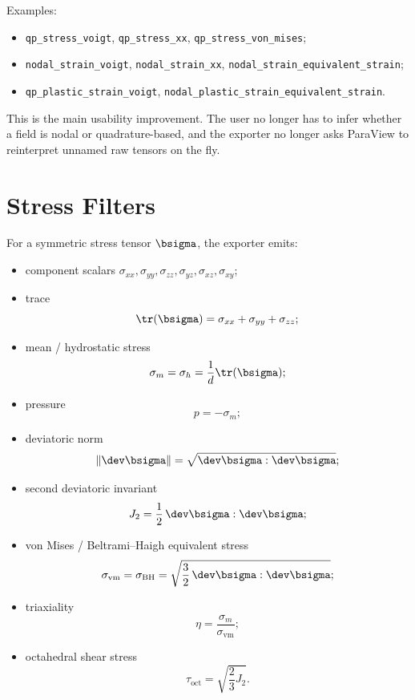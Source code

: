 Examples:
\begin{itemize}[nosep]
  \item \texttt{qp\_stress\_voigt}, \texttt{qp\_stress\_xx},
        \texttt{qp\_stress\_von\_mises};
  \item \texttt{nodal\_strain\_voigt}, \texttt{nodal\_strain\_xx},
        \texttt{nodal\_strain\_equivalent\_strain};
  \item \texttt{qp\_plastic\_strain\_voigt},
        \texttt{nodal\_plastic\_strain\_equivalent\_strain}.
\end{itemize}

This is the main usability improvement.  The user no longer has to infer
whether a field is nodal or quadrature-based, and the exporter no longer asks
ParaView to reinterpret unnamed raw tensors on the fly.


\section{Stress Filters}
\label{sec:vtk_tensor_filters_stress}

For a symmetric stress tensor $\bsigma$, the exporter emits:
\begin{itemize}[nosep]
  \item component scalars
        $\sigma_{xx}, \sigma_{yy}, \sigma_{zz}, \sigma_{yz}, \sigma_{xz},
        \sigma_{xy}$;
  \item trace
        \[
          \tr(\bsigma) = \sigma_{xx} + \sigma_{yy} + \sigma_{zz};
        \]
  \item mean / hydrostatic stress
        \[
          \sigma_m = \sigma_h = \frac{1}{d}\tr(\bsigma);
        \]
  \item pressure
        \[
          p = -\sigma_m;
        \]
  \item deviatoric norm
        \[
          \|\dev \bsigma\| = \sqrt{\dev \bsigma : \dev \bsigma};
        \]
  \item second deviatoric invariant
        \[
          J_2 = \frac{1}{2}\,\dev \bsigma : \dev \bsigma;
        \]
  \item von Mises / Beltrami--Haigh equivalent stress
        \[
          \sigma_{\mathrm{vm}}
          =
          \sigma_{\mathrm{BH}}
          =
          \sqrt{\frac{3}{2}\,\dev \bsigma : \dev \bsigma};
        \]
  \item triaxiality
        \[
          \eta = \frac{\sigma_m}{\sigma_{\mathrm{vm}}};
        \]
  \item octahedral shear stress
        \[
          \tau_{\mathrm{oct}} = \sqrt{\frac{2}{3}J_2}.
        \]
\end{itemize}

